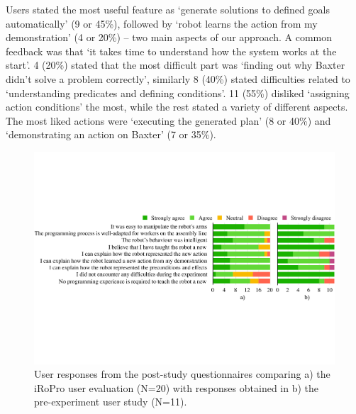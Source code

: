 Users stated the most useful feature as `generate solutions to defined goals automatically' (9 or 45\%), followed by `robot learns the action from my demonstration' (4 or 20\%) -- two main aspects of our approach.
A common feedback was that `it takes time to understand how the system works at the start'.
4 (20\%) stated that the most difficult part was `finding out why Baxter didn't solve a problem correctly', similarly 8 (40\%) stated difficulties related to `understanding predicates and defining conditions'. 
11 (55\%) disliked `assigning action conditions' the most, while the rest stated a variety of different aspects.
The most liked actions were `executing the generated plan' (8 or 40\%) and `demonstrating an action on Baxter' (7 or 35\%).

\begin{figure}[htp]
	\includegraphics[width=0.98\linewidth]{figures/quan-exp1vsexp2-results.pdf}
	\caption{User responses from the post-study questionnaires comparing a) the iRoPro user evaluation (N=20) with responses obtained in b) the pre-experiment user study (N=11).}
	\label{fig:exp1vsexp2-results}
\end{figure}



